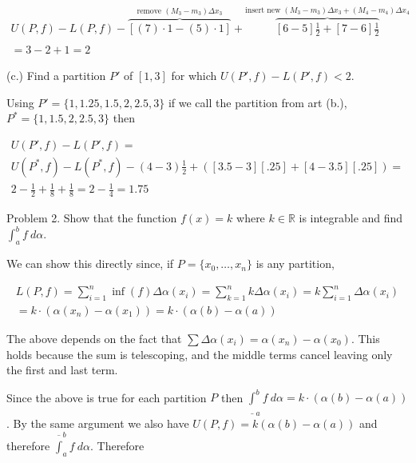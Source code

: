 \documentclass{article}
\begin{document}
  \begin{align*}
    U(P,f)-L(P,f)-\overbrace{[(7)\cdot 1-(5)\cdot 1]}^{\text{remove $(M_3-m_3)\Delta x_3$}} + \overbrace{[6-5]\frac 1 2 + [7-6]\frac 1 2}^{\text{insert new $(M_3-m_3)\Delta x_3 +(M_4-m_4)\Delta x_4$}} \\\\
    = 3-2+1 = 2
  \end{align*}

  \vspace{1cm}

  {\Large \color{Sepia} (c.) Find a partition $P'$ of $[1,3]$ for which $U(P',f)-L(P',f)<2$.}

  \vspace{1cm}

  Using $P'=\{1,1.25,1.5,2,2.5,3\}$ if we call the partition from art (b.), $P^*=\{1,1.5,2,2.5,3\}$ then

  \begin{align*}
    U(P',f)-L(P',f) = \\
    U(P^*,f)-L(P^*,f)-(4-3)\frac 1 2+\left([3.5-3][.25]+[4-3.5][.25]\right) = \\
    2 -\frac 1 2 + \frac 1 8 +\frac 1 8 = 2-\frac 1 4 = 1.75
  \end{align*}

  \pagebreak


  {\Large \color{Sepia} Problem 2. Show that the function $f(x)=k$ where $k\in\mathbb R$ is integrable and find $\int_a^b f\ d\alpha$. }

  \vspace{1cm}

  We can show this directly since, if $P=\{x_0,\dots,x_n\}$ is any partition,

  \begin{align*}
    L(P,f)=\sum_{i=1}^n \inf(f)\Delta \alpha(x_i) = \sum_{k=1}^n k\Delta \alpha(x_i) = k\sum_{i=1}^n \Delta \alpha(x_i) \\
    = k\cdot (\alpha(x_n)-\alpha(x_1)) = k\cdot (\alpha(b)-\alpha(a))
  \end{align*}

  The above depends on the fact that $\sum \Delta \alpha(x_i) = \alpha(x_n)-\alpha(x_0)$.  This holds because the sum is telescoping, and the middle terms cancel leaving only the first and last term.

  Since the above is true for each partition $P$ then $\underline \int_{a}^b f\ d\alpha = k\cdot (\alpha(b)-\alpha(a))$.  By the same argument we also have $U(P,f)=k(\alpha(b)-\alpha(a))$ and therefore $\overline \int_a^b f\ d\alpha$.  Therefore
\end{document}
